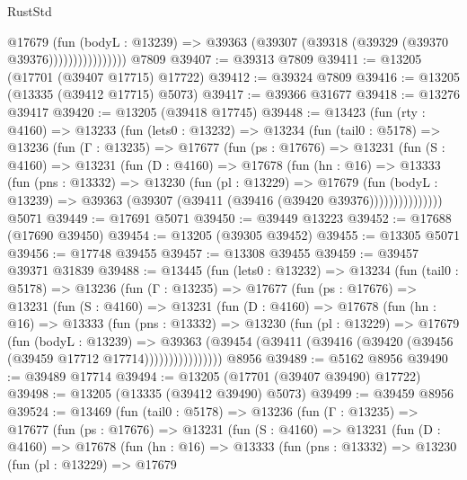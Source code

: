 \begin{lexlean}{RustStd}
\begin{coremodule}
                        @17679
                          (fun (bodyL : @13239) =>
                          @39363 (@39307 (@39318 (@39329 (@39370 @39376))))))))))))))))
    @7809
@39407 := @39313 @7809
@39411 := @13205 (@17701 (@39407 @17715) @17722)
@39412 := @39324 @7809
@39416 := @13205 (@13335 (@39412 @17715) @5073)
@39417 := @39366 @31677
@39418 := @13276 @39417
@39420 := @13205 (@39418 @17745)
@39448 := @13423
    (fun (rty : @4160) =>
    @13233
      (fun (lets0 : @13232) =>
      @13234
        (fun (tail0 : @5178) =>
        @13236
          (fun (Γ : @13235) =>
          @17677
            (fun (ps : @17676) =>
            @13231
              (fun (S : @4160) =>
              @13231
                (fun (D : @4160) =>
                @17678
                  (fun (hn : @16) =>
                  @13333
                    (fun (pns : @13332) =>
                    @13230
                      (fun (pl : @13229) =>
                      @17679
                        (fun (bodyL : @13239) =>
                        @39363 (@39307 (@39411 (@39416 (@39420 @39376)))))))))))))))
    @5071
@39449 := @17691 @5071
@39450 := @39449 @13223
@39452 := @17688 (@17690 @39450)
@39454 := @13205 (@39305 @39452)
@39455 := @13305 @5071
@39456 := @17748 @39455
@39457 := @13308 @39455
@39459 := @39457 @39371 @31839
@39488 := @13445
    (fun (lets0 : @13232) =>
    @13234
      (fun (tail0 : @5178) =>
      @13236
        (fun (Γ : @13235) =>
        @17677
          (fun (ps : @17676) =>
          @13231
            (fun (S : @4160) =>
            @13231
              (fun (D : @4160) =>
              @17678
                (fun (hn : @16) =>
                @13333
                  (fun (pns : @13332) =>
                  @13230
                    (fun (pl : @13229) =>
                    @17679
                      (fun (bodyL : @13239) =>
                      @39363
                        (@39454
                          (@39411 (@39416 (@39420 (@39456 (@39459 @17712 @17714))))))))))))))))
    @8956
@39489 := @5162 @8956
@39490 := @39489 @17714
@39494 := @13205 (@17701 (@39407 @39490) @17722)
@39498 := @13205 (@13335 (@39412 @39490) @5073)
@39499 := @39459 @8956
@39524 := @13469
    (fun (tail0 : @5178) =>
    @13236
      (fun (Γ : @13235) =>
      @17677
        (fun (ps : @17676) =>
        @13231
          (fun (S : @4160) =>
          @13231
            (fun (D : @4160) =>
            @17678
              (fun (hn : @16) =>
              @13333
                (fun (pns : @13332) =>
                @13230
                  (fun (pl : @13229) =>
                  @17679

\end{coremodule}
\end{lexlean}
